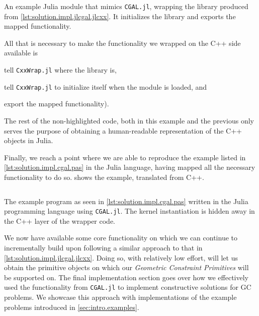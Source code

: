 \begin{listing}[htbp]
  \inputminted[highlightlines={4-6,8,10}]{julia}{jl/CGAL.jl} 
  \caption[Bare-bones Julia module wrapping some of CGAL]{
    An example Julia module that mimics \texttt{CGAL.jl}, wrapping the library
    produced from \cref{lst:solution.impl.jlcgal.jlcxx}.  It initializes the
    library and exports the mapped functionality.}%
  \label{lst:solution.impl.jlcgal.cgal}
\end{listing}

All that is necessary to make the functionality we wrapped on the C++ side
available is
\begin{enumerate*}[label= (\arabic*)]
  \item tell \texttt{CxxWrap.jl} where the library is,
  \item tell \texttt{CxxWrap.jl} to initialize itself when the module is loaded,
  and
  \item export the mapped functionality).
\end{enumerate*}
The rest of the non-highlighted code, both in this example and the previous
only serves the purpose of obtaining a human-readable representation of the C++
objects in Julia.

Finally, we reach a point where we are able to reproduce the example listed in
\cref{lst:solution.impl.cgal.pas} in the Julia language, having mapped all the
necessary functionality to do so.   shows the
example, translated from C++.

\begin{listing}[htbp]
  \inputminted{julia}{jl/points_and_segments.jl}
  \caption[CGAL.jl: Three points and one segment]{
    The example program as seen in \cref{lst:solution.impl.cgal.pas} written in
    the Julia programming language using \texttt{CGAL.jl}.  The kernel
    instantiation is hidden away in the C++ layer of the wrapper code.}%
  \label{lst:solution.impl.jlcgal.pas}
\end{listing}

We now have available some core functionality on which we can continue to
incrementally build upon following a similar approach to that in
\cref{lst:solution.impl.jlcgal.jlcxx}.  Doing so, with relatively low effort,
will let us obtain the primitive objects on which our \textit{Geometric
Constraint Primitives} will be supported on.  The final implementation section
goes over how we effectively used the functionality from \texttt{CGAL.jl} to
implement constructive solutions for \ac{GC} problems.  We showcase this
approach with implementations of the example problems introduced in
\cref{sec:intro.examples}.
